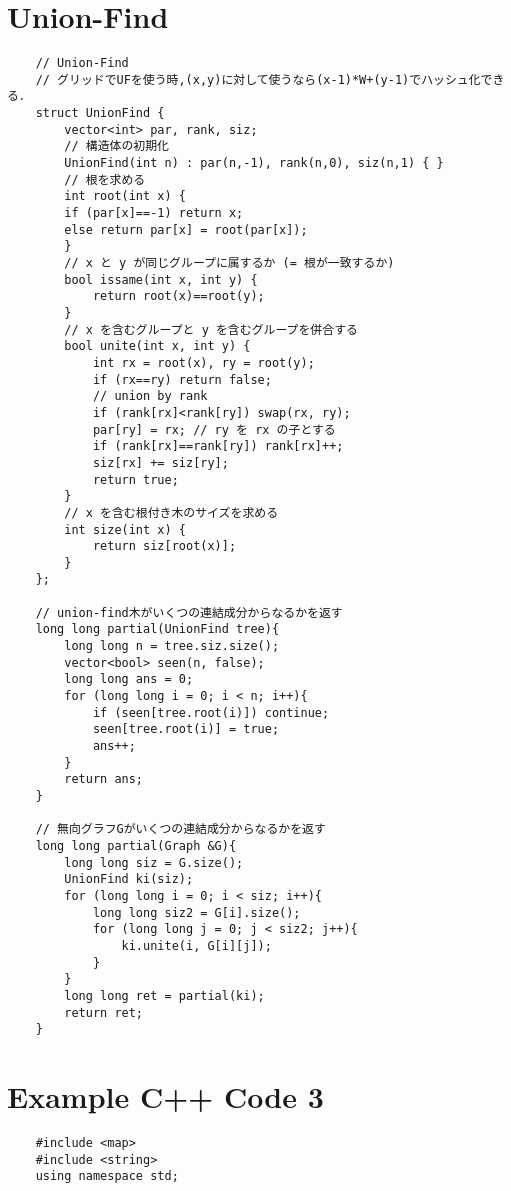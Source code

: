 \documentclass[a4paper, landscape, 9pt]{jarticle} %
\begin{document}
\begin{multicols*}{3}
    \section*{Union-Find}
    \begin{lstlisting}
    // Union-Find
    // グリッドでUFを使う時,(x,y)に対して使うなら(x-1)*W+(y-1)でハッシュ化できる．
    struct UnionFind {
        vector<int> par, rank, siz;
        // 構造体の初期化
        UnionFind(int n) : par(n,-1), rank(n,0), siz(n,1) { }
        // 根を求める
        int root(int x) {
        if (par[x]==-1) return x;
        else return par[x] = root(par[x]);
        }
        // x と y が同じグループに属するか (= 根が一致するか)
        bool issame(int x, int y) {
            return root(x)==root(y);
        }
        // x を含むグループと y を含むグループを併合する
        bool unite(int x, int y) {
            int rx = root(x), ry = root(y);
            if (rx==ry) return false;
            // union by rank
            if (rank[rx]<rank[ry]) swap(rx, ry);
            par[ry] = rx; // ry を rx の子とする
            if (rank[rx]==rank[ry]) rank[rx]++;
            siz[rx] += siz[ry];
            return true;
        }
        // x を含む根付き木のサイズを求める
        int size(int x) {
            return siz[root(x)];
        }
    };
    
    // union-find木がいくつの連結成分からなるかを返す
    long long partial(UnionFind tree){
        long long n = tree.siz.size();
        vector<bool> seen(n, false);
        long long ans = 0;
        for (long long i = 0; i < n; i++){
            if (seen[tree.root(i)]) continue;
            seen[tree.root(i)] = true;
            ans++;
        }
        return ans;
    }
    
    // 無向グラフGがいくつの連結成分からなるかを返す
    long long partial(Graph &G){
        long long siz = G.size();
        UnionFind ki(siz);
        for (long long i = 0; i < siz; i++){
            long long siz2 = G[i].size();
            for (long long j = 0; j < siz2; j++){
                ki.unite(i, G[i][j]);
            }
        }
        long long ret = partial(ki);
        return ret;
    }
    \end{lstlisting}

    \section*{Example C++ Code 3}
    \begin{lstlisting}
    #include <map>
    #include <string>
    using namespace std;


\end{lstlisting}
\end{multicols*}
\end{document}
